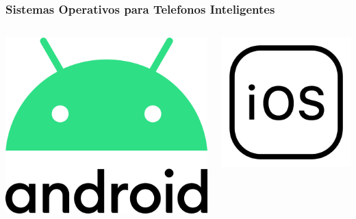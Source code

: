\begin{frame}
\frametitle{Sistemas Operativos para Telefonos Inteligentes} 
\begin{columns}
\begin{center}
\includegraphics[width=0.95\linewidth]{00_IntroProgramacionYMoviles/Android.png} 
\end{center}

\begin{center}
\includegraphics[width=0.95\linewidth]{00_IntroProgramacionYMoviles/iOs.png} 
\end{center}


\end{columns}
\end{frame}

